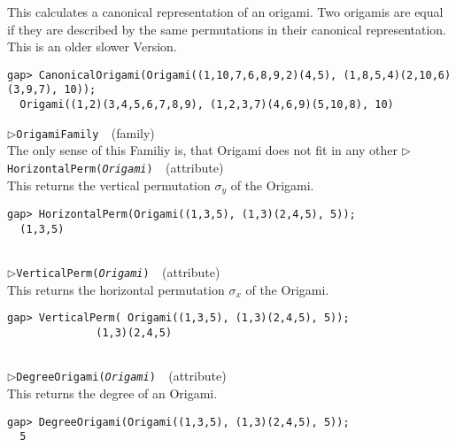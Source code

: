 \documentclass[a4paper,11pt]{report}
\begin{document}
{{{ This calculates a canonical representation of an origami. Two origamis are
equal if they are described by the same permutations in their canonical
representation. This is an older slower Version. 
\begin{Verbatim}[commandchars=!@|,fontsize=\small,frame=single,label=Example]
    gap> CanonicalOrigami(Origami((1,10,7,6,8,9,2)(4,5), (1,8,5,4)(2,10,6)(3,9,7), 10));
  Origami((1,2)(3,4,5,6,7,8,9), (1,2,3,7)(4,6,9)(5,10,8), 10)
\end{Verbatim}
 \noindent\textcolor{FuncColor}{$\triangleright$\enspace\texttt{OrigamiFamily
\label{OrigamiFamily}
}\hfill{\scriptsize (family)}}\\


 The only sense of this Familiy is, that Origami does not fit in any other \noindent\textcolor{FuncColor}{$\triangleright$\enspace\texttt{HorizontalPerm({\mdseries\slshape Origami})
\label{HorizontalPerm}
}\hfill{\scriptsize (attribute)}}\\


 This returns the vertical permutation $\sigma_y$ of the Origami. 
\begin{Verbatim}[commandchars=!@|,fontsize=\small,frame=single,label=Example]
            gap> HorizontalPerm(Origami((1,3,5), (1,3)(2,4,5), 5));
  (1,3,5)
          
\end{Verbatim}
 \noindent\textcolor{FuncColor}{$\triangleright$\enspace\texttt{VerticalPerm({\mdseries\slshape Origami})
\label{VerticalPerm}
}\hfill{\scriptsize (attribute)}}\\


 This returns the horizontal permutation $\sigma_x$ of the Origami. 
\begin{Verbatim}[commandchars=!@|,fontsize=\small,frame=single,label=Example]
            gap> VerticalPerm( Origami((1,3,5), (1,3)(2,4,5), 5));
              (1,3)(2,4,5)
          
\end{Verbatim}
 \noindent\textcolor{FuncColor}{$\triangleright$\enspace\texttt{DegreeOrigami({\mdseries\slshape Origami})
\label{DegreeOrigami}
}\hfill{\scriptsize (attribute)}}\\


 This returns the degree of an Origami. 
\begin{Verbatim}[commandchars=!@|,fontsize=\small,frame=single,label=Example]
            gap> DegreeOrigami(Origami((1,3,5), (1,3)(2,4,5), 5));
  5
          

\end{Verbatim}}}}
\end{document}
